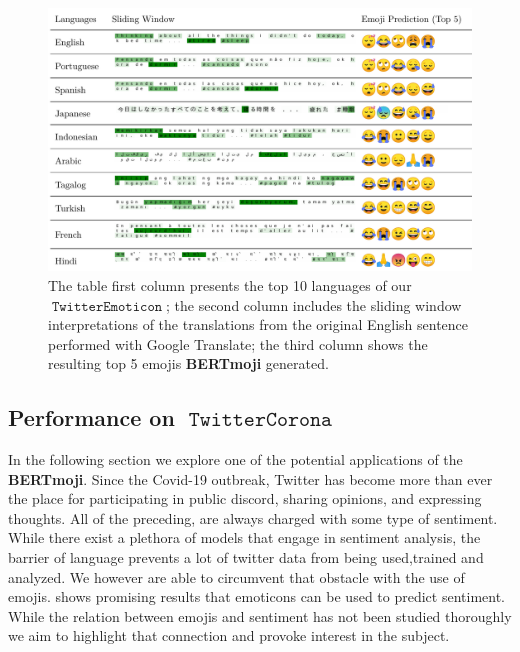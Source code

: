 \documentclass[11pt]{article}
\DeclareMathOperator{\emoticon}{\texttt{TwitterEmoticon}}
\DeclareMathOperator{\corona}{\texttt{TwitterCorona}}
\begin{document}
\begin{figure}[ht]
    \centering
    \includegraphics[width=\textwidth]{images/PREDICTMOJI.pdf}
    \caption{The table first column presents the top 10 languages of our $\emoticon$; 
    the second column includes the sliding window interpretations of the translations from the original English sentence performed with Google Translate;
    the third column shows the resulting top 5 emojis \textbf{BERTmoji} generated.
     }
    \label{fig:prediction_top10_langs}
\end{figure}

\subsection{Performance on $\corona$}
In the following section we explore one of the potential applications of the \textbf{BERTmoji}.
Since the Covid-19 outbreak, Twitter has become more than ever the place for participating in public discord, 
sharing opinions, and expressing thoughts. All of the preceding, are always charged with some type of sentiment.
While there exist a plethora of models that engage in sentiment analysis, the barrier of language prevents a lot 
of twitter data from being used,trained and analyzed. We however are able to circumvent that obstacle with the use of emojis.
\cite{CAN EMOTICONS BE USED TO PREDICT SENTIMENT?} shows promising results that emoticons can be used to predict sentiment. 
While the relation between emojis and sentiment has not been studied thoroughly we aim to highlight that connection and 
provoke interest in the subject.
\end{document}
